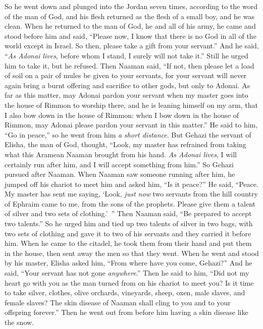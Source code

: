\begin{biblechapter}
\verse So he went down and plunged into the Jordan seven times, according to the word of the man of God, and his flesh returned as the flesh of a small boy, and he was clean.
 When he returned to the man of God, he and all of his army, he came and stood before him and said, “Please now, I know that there is no God in all of the world except in Israel. So then, please take a gift from your servant.”
\verse And he said, “\textit{As Adonai lives}, before whom I stand, I surely will not take it.” Still he urged him to take it, but he refused.
\verse Then Naaman said, “If not, then please let a load of soil on a pair of mules be given to your servants, for your servant will never again bring a burnt offering and sacrifice to other gods, but only to Adonai.
\verse As far as this matter, may Adonai pardon your servant when my master goes into the house of Rimmon to worship there, and he is leaning himself on my arm, that I also bow down in the house of Rimmon: when I bow down in the house of Rimmon, may Adonai please pardon your servant in this matter.”
\verse He said to him, “Go in peace,” so he went from him \textit{a short distance}.
\verse But Gehazi the servant of Elisha, the man of God, thought, “Look, my master has refrained from taking what this Aramean Naaman brought from his hand. \textit{As Adonai lives}, I will certainly run after him, and I will accept something from him.”
\verse So Gehazi pursued after Naaman. When Naaman saw someone running after him, he jumped off his chariot to meet him and asked him, “Is it peace?”
\verse He said, “Peace. My master has sent me saying, ‘Look, \textit{just now} two servants from the hill country of Ephraim came to me, from the sons of the prophets. Please give them a talent of silver and two sets of clothing.’ ”
\verse Then Naaman said, “Be prepared to accept two talents.” So he urged him and tied up two talents of silver in two bags, with two sets of clothing and gave it to two of his servants and they carried it before him.
\verse When he came to the citadel, he took them from their hand and put them in the house, then sent away the men so that they went.
\verse When he went and stood by his master, Elisha asked him, “From where have you come, Gehazi?” And he said, “Your servant has not gone \textit{anywhere}.”
\verse Then he said to him, “Did not my heart go with you as the man turned from on his chariot to meet you? Is it time to take silver, clothes, olive orchards, vineyards, sheep, oxen, male slaves, and female slaves?
\verse The skin disease of Naaman shall cling to you and to your offspring forever.” Then he went out from before him having a skin disease like the snow.
\end{biblechapter}

